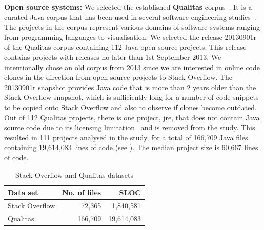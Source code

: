 \documentclass[10pt,journal,compsoc]{IEEEtran}
\begin{document}
\textbf{Open source systems: }
We selected the established \textbf{Qualitas} corpus~\cite{QualitasCorpus}. It is a curated Java corpus that has been used in several
software engineering
studies~\cite{Taube-Schock2011,Beckman2011,Vasilescu2011,Omar2012}. The
projects in the corpus represent various domains of software systems
ranging from programming languages to
visualisation. We selected the release 20130901r
of the Qualitas corpus containing 112 Java open source projects. This
release contains projects with releases no later than 1st September
2013. We intentionally chose an old corpus from 2013 since we are interested in
online code clones in the direction from open source projects to Stack
Overflow. The 20130901r snapshot provides Java code that is more than
2 years older than the Stack Overflow snapshot, which is sufficiently
long for a number of code snippets to be copied onto Stack Overflow
and also to observe if clones become outdated. Out of 112 Qualitas
projects, there is one project, \textsf{jre}, that does not contain
Java source code due to its licensing limitation~\cite{QualitasCorpus}
and is removed from the study. This resulted in 111
projects analysed in the study, for a total of 166,709 Java files containing 19,614,083
lines of code (see ). The median project size is 60,667 lines of code.

\begin{table}
	\centering
	\caption{Stack Overflow and Qualitas datasets}
	\label{tab:datasets}
	\begin{tabular}{lrr}
		\toprule
		Data set & No. of files & SLOC \\
		\midrule
		Stack Overflow & 72,365 & 1,840,581 \\ 
		Qualitas &  166,709 & 19,614,083 \\ 
		\bottomrule
	\end{tabular} 
\end{table}
\end{document}
